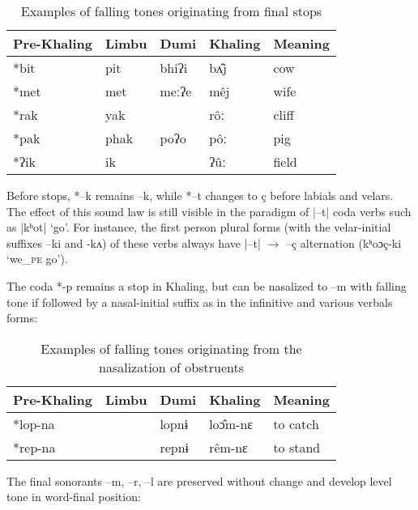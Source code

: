 \documentclass[oldfontcommands,oneside,a4paper,11pt]{article}
\newcommand{\ipa}[1]{{\phon \mbox{#1}}} %
\begin{document}
\begin{table}[H]
\caption{Examples of falling tones originating from final stops} \centering \label{tab:fall.stop}
\begin{tabular}{lllll}
\toprule
Pre-Khaling	&Limbu	&Dumi	&Khaling	&Meaning\\
\midrule
\ipa{*bit}	& \ipa{pit} &	\ipa{bhiʔi}	 & \ipa{bʌ̂j} &	cow\\
\ipa{*met} &	\ipa{met}	& \ipa{meːʔe} &	\ipa{mêj} &	wife\\
\ipa{*rak}	& \ipa{yak}	& &	\ipa{rôː}	& cliff \\
\ipa{*pak} &	\ipa{phak}	& \ipa{poʔo}	& \ipa{pôː}	& pig\\
\ipa{*ʔik}	& \ipa{ik}	& &	\ipa{ʔûː}	& field\\
\bottomrule
\end{tabular}
\end{table}
 
Before stops, *--k remains \ipa{--k}, while *--t changes to \ipa{ç} before labials and velars. The effect of this sound law  is still visible in the paradigm of  |--t| coda verbs such as |kʰot| `go'. For instance, the first person plural forms (with the velar-initial suffixes \ipa{--ki} and \ipa{-kʌ}) of these verbs always have |--t| $\rightarrow$ \ipa{--ç} alternation  (\ipa{kʰoɔç-ki} `we_{\textsc{pe}} go').

The coda *-p remains a stop in Khaling, but can be nasalized to –m with falling tone if followed by a nasal-initial suffix as in the infinitive and various verbals forms:
\begin{table}[H]
\caption{Examples of falling tones originating from the nasalization of obstruents} \centering
\begin{tabular}{lllll}
\toprule
Pre-Khaling	&Limbu	&Dumi	&Khaling	&Meaning\\
\midrule
\ipa{*lop-na}	& & \ipa{lopnɨ}	 & \ipa{loɔ̂m-nɛ}	&to catch\\
\ipa{*rep-na}	& & \ipa{repnɨ	}& \ipa{rêm-nɛ}	&to stand\\
\bottomrule
\end{tabular}
\end{table}

The final sonorants \ipa{--m}, \ipa{--r}, \ipa{--l} are preserved without change and develop level tone in word-final position:
\end{document}

